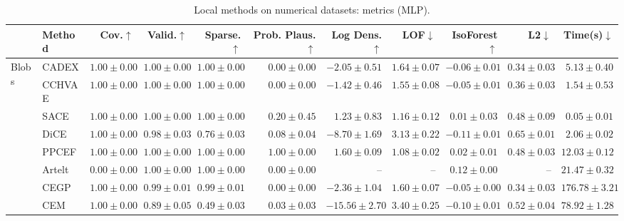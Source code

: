 \begin{table}[ht]
\centering
\caption{Local methods on numerical datasets: metrics (MLP).}
\label{tab:num_metrics_mlp}
\begin{center}
\begin{sc}
\begin{scriptsize}
\begin{tabular}{l|l|rrrrrrrrr}
\toprule
 & Method & Cov.$\uparrow$ & Valid.$\uparrow$ & Sparse.$\uparrow$ & Prob. Plaus.$\uparrow$ & Log Dens.$\uparrow$ & LOF$\downarrow$ & IsoForest$\uparrow$ & L2$\downarrow$ & Time(s)$\downarrow$ \\
\midrule
\multirow{9}{*}{Blobs} & CADEX & $\boldsymbol{1.00\pm{0.00}}$ & $\boldsymbol{1.00\pm{0.00}}$ & $\boldsymbol{1.00\pm{0.00}}$ & $0.00\pm{0.00}$ & $-2.05\pm{0.51}$ & $1.64\pm{0.07}$ & $-0.06\pm{0.01}$ & $\boldsymbol{0.34\pm{0.03}}$ & $5.13\pm{0.40}$ \\
 & CCHVAE & $\boldsymbol{1.00\pm{0.00}}$ & $\boldsymbol{1.00\pm{0.00}}$ & $\boldsymbol{1.00\pm{0.00}}$ & $0.00\pm{0.00}$ & $-1.42\pm{0.46}$ & $1.55\pm{0.08}$ & $-0.05\pm{0.01}$ & $0.36\pm{0.03}$ & $1.54\pm{0.53}$ \\
 & SACE & $\boldsymbol{1.00\pm{0.00}}$ & $\boldsymbol{1.00\pm{0.00}}$ & $\boldsymbol{1.00\pm{0.00}}$ & $0.20\pm{0.45}$ & $1.23\pm{0.83}$ & $1.16\pm{0.12}$ & $0.01\pm{0.03}$ & $0.48\pm{0.09}$ & $\boldsymbol{0.05\pm{0.01}}$ \\
 & DiCE & $\boldsymbol{1.00\pm{0.00}}$ & $0.98\pm{0.03}$ & $0.76\pm{0.03}$ & $0.08\pm{0.04}$ & $-8.70\pm{1.69}$ & $3.13\pm{0.22}$ & $-0.11\pm{0.01}$ & $0.65\pm{0.01}$ & $2.06\pm{0.02}$ \\
 & PPCEF & $\boldsymbol{1.00\pm{0.00}}$ & $\boldsymbol{1.00\pm{0.00}}$ & $\boldsymbol{1.00\pm{0.00}}$ & $\boldsymbol{1.00\pm{0.00}}$ & $\boldsymbol{1.60\pm{0.09}}$ & $\boldsymbol{1.08\pm{0.02}}$ & $0.02\pm{0.01}$ & $0.48\pm{0.03}$ & $12.03\pm{0.12}$ \\
 & Artelt & $0.00\pm{0.00}$ & $\boldsymbol{1.00\pm{0.00}}$ & $\boldsymbol{1.00\pm{0.00}}$ & $0.00\pm{0.00}$ & -- & -- & $\boldsymbol{0.12\pm{0.00}}$ & -- & $21.47\pm{0.32}$ \\
 & CEGP & $\boldsymbol{1.00\pm{0.00}}$ & $0.99\pm{0.01}$ & $0.99\pm{0.01}$ & $0.00\pm{0.00}$ & $-2.36\pm{1.04}$ & $1.60\pm{0.07}$ & $-0.05\pm{0.00}$ & $\boldsymbol{0.34\pm{0.03}}$ & $176.78\pm{3.21}$ \\
 & CEM & $\boldsymbol{1.00\pm{0.00}}$ & $0.89\pm{0.05}$ & $0.49\pm{0.03}$ & $0.03\pm{0.03}$ & $-15.56\pm{2.70}$ & $3.40\pm{0.25}$ & $-0.10\pm{0.01}$ & $0.52\pm{0.04}$ & $78.92\pm{1.28}$ \\

\end{tabular}
\end{scriptsize}
\end{sc}
\end{center}
\end{table}
